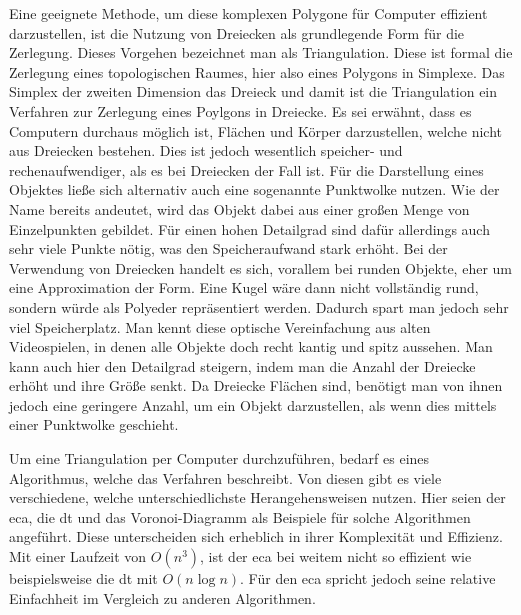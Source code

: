 Eine geeignete Methode, um diese komplexen Polygone für Computer effizient darzustellen, ist die Nutzung von Dreiecken als grundlegende Form für die Zerlegung.
Dieses Vorgehen bezeichnet man als Triangulation. Diese ist formal die Zerlegung eines topologischen Raumes, hier also eines Polygons in Simplexe. Das Simplex der zweiten Dimension das Dreieck und damit ist die Triangulation
ein Verfahren zur Zerlegung eines Poylgons in Dreiecke.
Es sei erwähnt, dass es Computern durchaus möglich ist, Flächen und Körper darzustellen, welche nicht aus Dreiecken bestehen. Dies ist jedoch wesentlich speicher- und rechenaufwendiger, als es bei
Dreiecken der Fall ist. Für die Darstellung eines Objektes ließe sich alternativ auch eine sogenannte Punktwolke nutzen. Wie der Name bereits andeutet, wird das Objekt dabei aus einer großen Menge
von Einzelpunkten gebildet. Für einen hohen Detailgrad sind dafür allerdings auch sehr viele Punkte nötig, was den Speicheraufwand stark erhöht. Bei der Verwendung von Dreiecken handelt es sich, vorallem
bei runden Objekte, eher um eine Approximation der Form. Eine Kugel wäre dann nicht vollständig rund, sondern würde als Polyeder repräsentiert werden. Dadurch spart man jedoch sehr viel Speicherplatz.
Man kennt diese optische Vereinfachung aus alten Videospielen, in denen alle Objekte doch recht kantig und spitz aussehen. Man kann auch hier den Detailgrad steigern, indem man die Anzahl
der Dreiecke erhöht und ihre Größe senkt. Da Dreiecke Flächen sind, benötigt man von ihnen jedoch eine geringere Anzahl, um ein Objekt darzustellen, als wenn dies mittels einer Punktwolke geschieht.

Um eine Triangulation per Computer durchzuführen, bedarf es eines Algorithmus, welche das Verfahren beschreibt. Von diesen gibt es viele verschiedene, welche unterschiedlichste Herangehensweisen nutzen.
Hier seien der \ac{eca}, die \ac{dt} und das Voronoi-Diagramm als Beispiele für solche Algorithmen angeführt. Diese unterscheiden sich erheblich in ihrer Komplexität und Effizienz. 
Mit einer Laufzeit von $O(n^3)$\cite{earclipping2}, ist der \ac{eca} bei weitem nicht so effizient wie beispielsweise die \ac{dt} mit $O(n\log n)$. Für den \ac{eca} spricht jedoch seine relative Einfachheit im Vergleich zu anderen Algorithmen.\linebreak 

